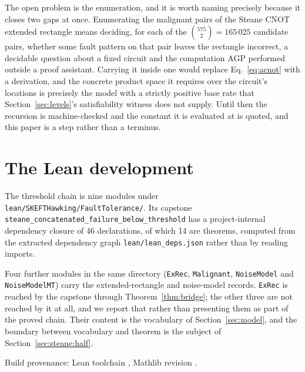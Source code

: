 \documentclass[aps,prx,reprint,nofootinbib,superscriptaddress]{revtex4-2}
\begin{document}
The open problem is the enumeration, and it is worth naming precisely because it
closes two gaps at once. Enumerating the malignant pairs of the Steane CNOT
extended rectangle means deciding, for each of the $\binom{575}{2} = 165\,025$
candidate pairs, whether some fault pattern on that pair leaves the rectangle
incorrect, a decidable question about a fixed circuit and the computation AGP
performed outside a proof assistant. Carrying it inside one would replace
Eq.~\eqref{eq:acnot} with a derivation, and the concrete product space it
requires over the circuit's locations is precisely the model with a strictly
positive base rate that Section~\ref{sec:levels}'s satisfiability witness does
not supply. Until then the recursion is machine-checked and the constant it is
evaluated at is quoted, and this paper is a step rather than a terminus.

\appendix
\section{The Lean development}
\label{app:lean}

The threshold chain is nine modules under
\verb|lean/SKEFTHawking/FaultTolerance/|. Its capstone
\verb|steane_concatenated_failure_below_threshold| has a project-internal
dependency closure of 46 declarations, of which 14 are theorems, computed from
the extracted dependency graph \verb|lean/lean_deps.json| rather than by reading
imports.

\begin{table}[htbp]
\caption{Modules in the capstone's dependency closure, and what each contributes.}
\label{tab:modules}
\begin{ruledtabular}

\end{ruledtabular}
\end{table}

Four further modules in the same directory (\verb|ExRec|, \verb|Malignant|,
\verb|NoiseModel| and \verb|NoiseModelMT|) carry the extended-rectangle and
noise-model records. \verb|ExRec| is reached by the capstone through
Theorem~\ref{thm:bridge}; the other three are not reached by it at all, and we
report that rather than presenting them as part of the proved chain. Their
content is the vocabulary of Section~\ref{sec:model}, and the boundary between
vocabulary and theorem is the subject of Section~\ref{sec:steane:half}.

Build provenance: Lean toolchain \leantoolchain, Mathlib revision
\mathlibrev.
\end{document}
